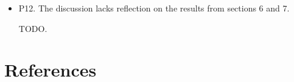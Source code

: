 \documentclass[a4paper,danish]{article}
\newcommand{\1}{\mathds{1}}
\begin{document}
\begin{itemize}
\item P12. The discussion lacks reflection on the results from sections 6
and 7.

TODO.
\end{itemize}




\section*{References}
\label{sec:orgd31e305}
\renewcommand{\section}[2]{} 

\end{document}
